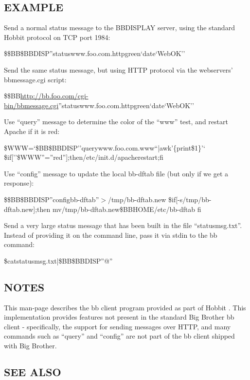 \subsection{EXAMPLE}


 Send a normal status message to the BBDISPLAY server, using the
 standard Hobbit protocol on TCP port 1984:  

 
\$\$BB\$BBDISP''statuswww.foo.com.httpgreen`date`WebOK'' 


  Send the same status message, but using HTTP protocol via the webservers' bbmessage.cgi script:  
 
\$\$BB\url{http://bb.foo.com/cgi-bin/bbmessage.cgi}''statuswww.foo.com.httpgreen`date`WebOK'' 


  Use ``query'' message to determine the color of the ``www'' test, and restart Apache if it is red:  



\$WWW=`\$BB\$BBDISP''querywww.foo.com.www``|awk'\{print\$1\}'`  \$if[''\$WWW''=''red''];then/etc/init.d/apacherestart;fi 


  Use ``config'' message to update the local bb-dftab file (but only if we get a response):  


  
\$\$BB\$BBDISP''configbb-dftab''$>$/tmp/bb-dftab.new  
\$if[-s/tmp/bb-dftab.new];then  
mv/tmp/bb-dftab.new\$BBHOME/etc/bb-dftab  
fi 


  Send a very large status message that has been built in the file
  ``statusmsg.txt''. Instead of providing it on the command line, pass
  it via stdin to the bb command: 



  
\$catstatusmsg.txt|\$BB\$BBDISP''@'' 


 
\subsection{NOTES}
 This man-page describes the bb client program provided as part of
 Hobbit . This implementation provides features not present in the
 standard Big Brother bb client - specifically, the support for
 sending messages over HTTP, and many commands such as ``query'' and
 ``config'' are not part of the bb client shipped with Big Brother. 


 
\subsection{SEE ALSO}

